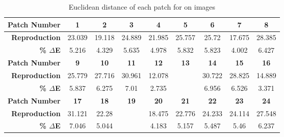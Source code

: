 \begin{table}[H]
  \caption{Euclidean distance of each patch for on images }
  \begin{center}
    \begin{tabularx}{\textwidth}{r c c c c c c c c}
    \toprule
        \textbf{Patch Number} & \textbf{1} & \textbf{2} & \textbf{3} & \textbf{4} & \textbf{5} & \textbf{6} & \textbf{7} & \textbf{8}\\ \midrule 
        \textbf{Reproduction} &23.039 &19.118 &24.889 &21.985 &25.757 &25.72 &17.675 &28.385\\ 
        \textbf{\textbf{\% $\Delta$E}} &5.216 &4.329 &5.635 &4.978 &5.832 &5.823 &4.002 &6.427\\ \midrule 
        \textbf{Patch Number} & \textbf{9} & \textbf{10} & \textbf{11} & \textbf{12} & \textbf{13} & \textbf{14} & \textbf{15} & \textbf{16}\\ \midrule 
        \textbf{Reproduction} &25.779 &27.716 &30.961 &12.078 &\cellcolor{colorred}{31.537} &30.722 &28.825 &14.889\\ 
        \textbf{\textbf{\% $\Delta$E}} &5.837 &6.275 &7.01 &2.735 &\cellcolor{colorred}{7.14} &6.956 &6.526 &3.371\\ \midrule 
        \textbf{Patch Number} & \textbf{17} & \textbf{18} & \textbf{19} & \textbf{20} & \textbf{21} & \textbf{22} & \textbf{23} & \textbf{24}\\ \midrule 
        \textbf{Reproduction} &31.121 &22.28 &\cellcolor{colorgreen}{5.415} &18.475 &22.776 &24.233 &24.114 &27.548\\ 
        \textbf{\textbf{\% $\Delta$E}} &7.046 &5.044 &\cellcolor{colorgreen}{1.226} &4.183 &5.157 &5.487 &5.46 &6.237\\ \midrule 
    \bottomrule
    \end{tabularx}
  \end{center}
\end{table}
